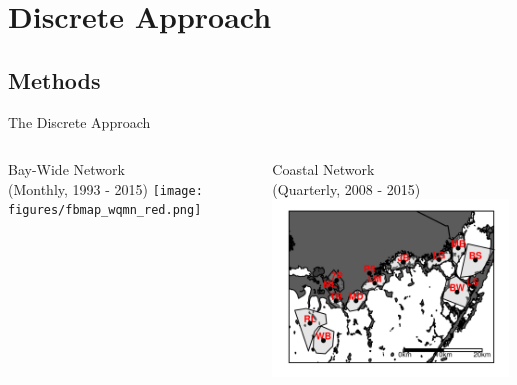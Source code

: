 \documentclass[compress,noflama,nosectionpages]{beamer}
\begin{document}
\section{Discrete Approach}
\subsection{Methods}
\begin{frame}{The Discrete Approach}
	\begin{columns}
		\begin{column}[c]{5.5cm}
			\begin{center}
			Bay-Wide Network\\ (Monthly, 1993 - 2015)
			\texttt{[image: figures/fbmap\_wqmn\_red.png]}%
			\end{center}
		\end{column}
	
		\begin{column}[c]{6cm}
			\begin{center}
			Coastal Network\\ (Quarterly, 2008 - 2015)
			\includegraphics[height=4.7cm,clip=true,trim = 0mm 0mm 0mm 0mm,keepaspectratio=true]{figures/fbmap_dflow.png}%
			\end{center}
		\end{column}
	\end{columns}
\end{frame}
\end{document}
